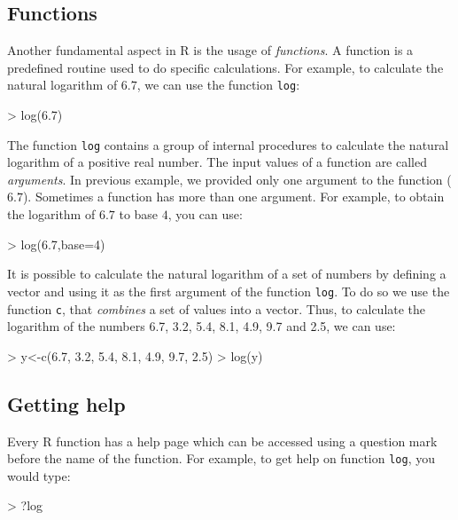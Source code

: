 \documentclass[letterpaper,12pt,oneside]{article}
\begin{document}
\subsection{Functions}
\label{functions}
Another fundamental aspect in R is the usage of {\it functions}. A function is a predefined routine used to do specific calculations. For example, to calculate the natural logarithm of $6.7$, we can use the function {\tt log}:
\begin{Schunk}
\begin{Sinput}
> log(6.7)
\end{Sinput}
\end{Schunk}
The function {\tt log} contains a group of internal procedures to calculate the natural logarithm of a positive real number. The input values of a function are called {\it arguments}. In previous example, we provided only one argument to the function ($6.7$). Sometimes a function has more than one argument. For example, to obtain the logarithm of $6.7$ to base $4$, you can use:
\begin{Schunk}
\begin{Sinput}
> log(6.7,base=4)
\end{Sinput}
\end{Schunk}
It is possible to calculate the natural logarithm of a set of numbers by defining a vector and using it as the first argument of the function {\tt log}. To do so we use the function {\tt c}, that {\it combines} a set of values into a vector. Thus, to calculate the logarithm of the numbers 6.7, 3.2, 5.4, 8.1, 4.9, 9.7 and 2.5, we can use:
\begin{Schunk}
\begin{Sinput}
> y<-c(6.7, 3.2, 5.4, 8.1, 4.9, 9.7, 2.5)
> log(y)
\end{Sinput}
\end{Schunk}

\subsection{Getting help}

Every R function has a help page which can be accessed using a question mark before the name of the function. For example, to get help on function {\tt log}, you would type:

\begin{Schunk}
\begin{Sinput}
> ?log
\end{Sinput}
\end{Schunk}
\end{document}
